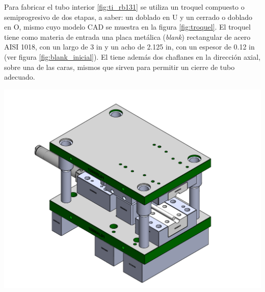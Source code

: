 Para fabricar el tubo interior \ref{fig:ti_rb131} se utiliza un troquel compuesto o semiprogresivo 
de dos etapas, a saber: un doblado en U y un cerrado o doblado en O, mismo cuyo modelo CAD se muestra 
en la figura \ref{fig:troquel}. El troquel tiene como materia de entrada una placa metálica 
(\textit{blank}) rectangular de acero AISI 1018, con un largo de 3 in y un acho de 2.125 in, 
con un espesor de 0.12 in (ver figura \ref{fig:blank_inicial}). El  tiene además 
dos chaflanes en la dirección axial, sobre una de las caras, mismos que sirven para permitir un 
cierre de tubo adecuado.



\begin{center}
\includegraphics[scale=0.4]{src/ch3/troquel.pdf}
\label{fig:troquel}
\end{center}



